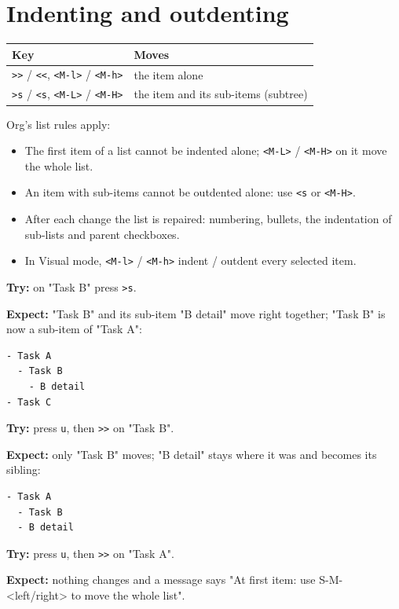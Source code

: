 \section{Indenting and outdenting}
\label{sec:org42f874c}
\begin{center}
\begin{tabular}{ll}
Key & Moves\\
\hline
\texttt{>{}>{}} / \texttt{<{}<{}}, \texttt{<M-l>} / \texttt{<M-h>} & the item alone\\
\texttt{>s} / \texttt{<s}, \texttt{<M-L>} / \texttt{<M-H>} & the item and its sub-items (subtree)\\
\end{tabular}
\end{center}

Org's list rules apply:
\begin{itemize}
\item The first item of a list cannot be indented alone; \texttt{<M-L>} / \texttt{<M-H>} on
it move the whole list.
\item An item with sub-items cannot be outdented alone: use \texttt{<s} or \texttt{<M-H>}.
\item After each change the list is repaired: numbering, bullets, the
indentation of sub-lists and parent checkboxes.
\item In Visual mode, \texttt{<M-l>} / \texttt{<M-h>} indent / outdent every selected item.
\end{itemize}

\textbf{Try:} on "Task B" press \texttt{>s}.

\textbf{Expect:} "Task B" and its sub-item "B detail" move right together; "Task
B" is now a sub-item of "Task A":
\begin{verbatim}
- Task A
  - Task B
    - B detail
- Task C
\end{verbatim}

\textbf{Try:} press \texttt{u}, then \texttt{>{}>{}} on "Task B".

\textbf{Expect:} only "Task B" moves; "B detail" stays where it was and becomes
its sibling:
\begin{verbatim}
- Task A
  - Task B
  - B detail
\end{verbatim}

\textbf{Try:} press \texttt{u}, then \texttt{>{}>{}} on "Task A".

\textbf{Expect:} nothing changes and a message says "At first item: use
S-M-<left/right> to move the whole list".

